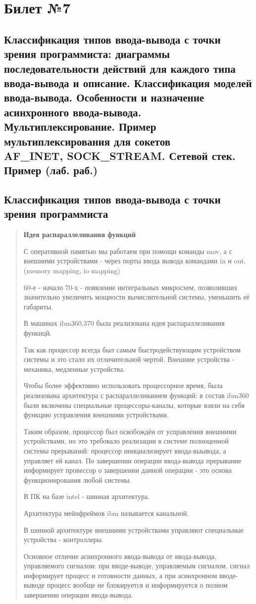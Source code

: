 \chapter{Билет №7}

\section*{Классификация типов ввода-вывода с точки зрения программиста: диаграммы последовательности действий для каждого типа ввода-вывода и описание. Классификация моделей ввода-вывода. Особенности и назначение асинхронного ввода-вывода. Мультиплексирование. Пример мультиплексирования для сокетов \\AF\_INET, SOCK\_STREAM. Сетевой стек. Пример (лаб. раб.)}

\section{Классификация типов ввода-вывода с точки зрения программиста}
\begin{quote}
\textbf{Идея распараллеливания функций}

С оперативной памятью мы работаем при помощи команды mov, а с внешними устройствами - через порты ввода вывода командами in и out. (memory mapping, io mapping)

60-е - начало 70-х - появление интегральных микросхем, позволивших значительно увеличить мощности вычислительной системы, уменьшить её габариты.

В машинах ibm360,370 была реализована идея распараллеливания функицй.

Так как процессор всегда был самым быстродействующим устройством системы и это стало их отличительной чертой. Внешние устройства - механика, медленные устройства.

Чтобы более эффективно использовать процессорное время, была реализована архитектура с распараллеливанием функций: в состав ibm360 были включены специальные процессоры-каналы, которые взяли на себя функцию усправления внешними устройствами.

Таким образом, процессор был освобождён от усправления внешними устройствами, но это требовало реализации в системе полноценной системы прерываний: процессор инициализирует ввода-выывода, а управляет ей канал. По завершении операции ввода-вывода прерывание информирует провессор о завершении данной операции - это основа функционирования любой системы.

В ПК на базе intel - шинная архитектура.

Архитектура мейнфреймов ibm называется канальной.

В шинной архитектуре внешними устройствами управляют специальные устройства - контроллеры.

Основное отличие асинхронного ввода-вывода от ввода-вывода, управляемого сигналом: при вводе-выводе, управляемым сигналом, сигнал информирует процесс и готовности данных, а при асинхронном вводе-выводе процесс вообще не блокируется и информируется о полном завершении операции ввода-вывода.
\end{quote}

